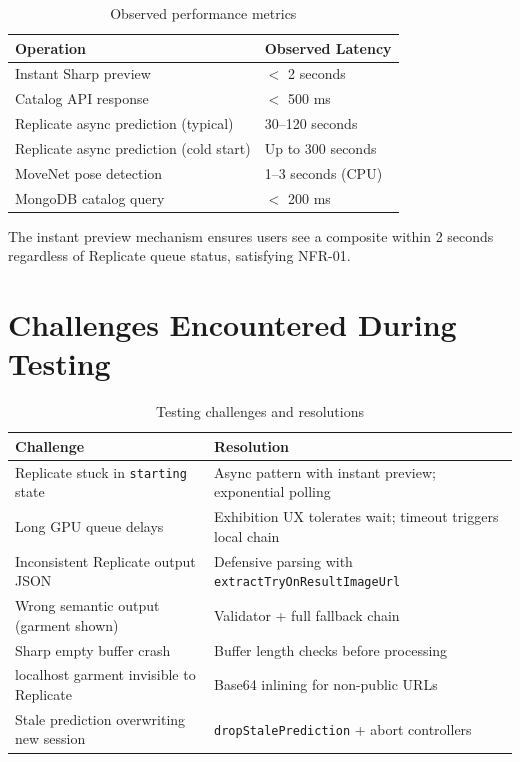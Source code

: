 \begin{table}[H]
  \centering
  \caption{Observed performance metrics}
  \label{tab:performance}
  \begin{tabular}{@{}ll@{}}
    \toprule
    \textbf{Operation} & \textbf{Observed Latency} \\
    \midrule
    Instant Sharp preview & $<$ 2 seconds \\
    Catalog API response & $<$ 500 ms \\
    Replicate async prediction (typical) & 30--120 seconds \\
    Replicate async prediction (cold start) & Up to 300 seconds \\
    MoveNet pose detection & 1--3 seconds (CPU) \\
    MongoDB catalog query & $<$ 200 ms \\
    \bottomrule
  \end{tabular}
\end{table}

The instant preview mechanism ensures users see a composite within 2 seconds regardless of Replicate queue status, satisfying NFR-01.

\section{Challenges Encountered During Testing}
\label{sec:testing-challenges}

\begin{table}[H]
  \centering
  \caption{Testing challenges and resolutions}
  \label{tab:testing-challenges}
  \small
  \begin{tabular}{@{}p{4cm}p{8cm}@{}}
    \toprule
    \textbf{Challenge} & \textbf{Resolution} \\
    \midrule
    Replicate stuck in \texttt{starting} state & Async pattern with instant preview; exponential polling \\
    Long GPU queue delays & Exhibition UX tolerates wait; timeout triggers local chain \\
    Inconsistent Replicate output JSON & Defensive parsing with \texttt{extractTryOnResultImageUrl} \\
    Wrong semantic output (garment shown) & Validator + full fallback chain \\
    Sharp empty buffer crash & Buffer length checks before processing \\
    localhost garment invisible to Replicate & Base64 inlining for non-public URLs \\
    Stale prediction overwriting new session & \texttt{dropStalePrediction} + abort controllers \\
    \bottomrule
  \end{tabular}
\end{table}

